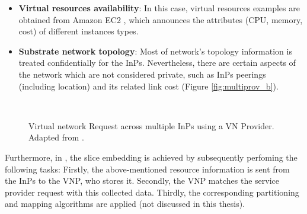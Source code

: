 \begin{itemize}
	\item \textbf{Virtual resources availability}: In this case, virtual resources examples are obtained from Amazon EC2 \cite{amazonEC2}, which announces the attributes (CPU, memory, cost) of different instances types.
	\item \textbf{Substrate network topology}: Most of network's topology information is treated confidentially for the InPs. Nevertheless, there are certain aspects of the network which are not considered private, such as InPs peerings (including location) and its related link cost (Figure \ref{fig:multiprov_b}).
\end{itemize}

\begin{figure}[bth]
	\myfloatalign
	 \quad
	 \\
	\caption{Virtual network Request across multiple InPs using a VN Provider. Adapted from \citep{dietrich2015multi}.}
	\label{fig:multiprov}
\end{figure}

Furthermore, in \citep{dietrich2015multi}, the slice embedding is achieved by subsequently perfoming the following tasks: Firstly, the above-mentioned resource information is sent from the InPs to the VNP, who stores it. Secondly, the VNP matches the service provider request with this collected data. Thirdly, the corresponding partitioning and mapping algorithms are applied (not discussed in this thesis). 

